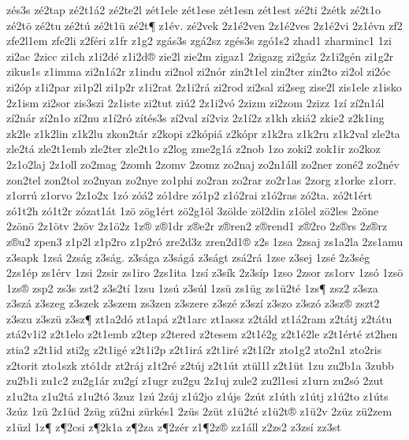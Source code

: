 {z^^e9s3s
z^^e92tap
z^^e92t1^^e12
z^^e92te2l
z^^e9t1ele
z^^e9t1ese
z^^e9t1esn
z^^e9t1est
z^^e92ti
2z^^e9tk
z^^e92t1o
z^^e92t^^f6
z^^e92tu
z^^e92t^^fa
z^^e92t1^^fc
z^^e92t^^b6
z1^^e9v.
z^^e92vek
2z1^^e92ven
2z1^^e92ves
2z1^^e92vi
2z1^^e9vn
zf2
zfe2l1em
zfe2li
z2f^^e9ri
z1fr
z1g2
zg^^e1s3s
zg^^e12sz
zg^^e9s3s
zg^^f31s2
zhad1
zharminc1
1zi
zi2ac
2zicc
zi1ch
z1i2d^^e9
z1i2d^^ae
zie2l
zie2m
zigaz1
2zigazg
zi2g^^e1z
2z1i2g^^e9n
zi1g2r
zikus1s
z1imma
zi2n1^^e12r
z1indu
zi2nol
zi2n^^f3r
zin2t1el
zin2ter
zin2to
zi2ol
zi2^^f3c
zi2^^f3p
z1i2par
zi1p2l
zi1p2r
z1i2rat
2z1i2r^^e1
zi2rod
zi2sal
zi2seg
zise2l
zis1ele
z1isko
2z1ism
zi2sor
zis3szi
2z1iste
zi2tut
zi^^fa2
2z1i2v^^f3
2zizm
zi2zom
2zizz
1z^^ed
z^^ed2n1^^e1l
z^^ed2n^^e1r
z^^ed2n1o
z^^ed2nu
z1^^ed2r^^f3
z^^edt^^e9s3s
z^^ed2val
z^^ed2viz
2z1^^ed2z
z1kh
zki^^e12
zkie2
z2k1ing
zk2le
z1k2lin
z1k2lu
zkon2t^^e1r
z2kopi
z2k^^f3pi^^e1
z2k^^f3pr
z1k2ra
z1k2ru
z1k2val
zle2ta
zle2t^^e1
zle2t1emb
zle2ter
zle2t1o
z2log
zme2g1^^e1
z2nob
1zo
zoki2
zok1ir
zo2koz
2z1o2laj
2z1oll
zo2mag
2zomh
2zomv
2zomz
zo2naj
zo2n1^^e1ll
zo2ner
zon^^e92
zo2n^^e9v
zon2tel
zon2tol
zo2nyan
zo2nye
zo1phi
zo2ran
zo2rar
zo2r1as
2zorg
z1orke
z1orr.
z1orr^^fa
z1orvo
2z1o2x
1z^^f3
z^^f3^^e12
z^^f31dre
z^^f31p2
z1^^f32rai
z1^^f32ras
z^^f32ta.
z^^f32t1^^e9rt
z^^f31t2h
z^^f31t2r
z^^f3zat1^^e1t
1z^^f6
z^^f6g1^^e9rt
z^^f62g1^^f6l
3z^^f6lde
z^^f6l2din
z1^^f6lel
z^^f62les
2z^^f6ne
2z^^f6n^^f6
2z1^^f6tv
2z^^f6v
2z1^^f62z
1z^^ae
z^^ae1dr
z^^aee2r
z^^aeren2
z^^aerend1
z^^ae2ro
2z^^aers
2z^^aerz
z^^aeu2
zpen3
z1p2l
z1p2ro
z1p2r^^f3
zre2d3z
zren2d1^^ae
z2s
1zsa
2zsaj
zs1a2la
2zs1amu
z3sapk
1zs^^e1
2zs^^e1g
z3s^^e1g.
z3s^^e1ga
z3s^^e1g^^e1
z3s^^e1gt
zs^^e12r^^e1
1zse
z3sej
1zs^^e9
2z3s^^e9g
2zs1^^e9p
zs1^^e9rv
1zsi
2zsir
zs1iro
2zs1ita
1zs^^ed
z3s^^edk
2z3s^^edp
1zso
2zsor
zs1orv
1zs^^f3
1zs^^f6
1zs^^ae
zsp2
zs3s
zst2
z3s2t^^ed
1zsu
1zs^^fa
z3s^^fal
1zs^^fc
zs1^^fcg
zs1^^fc2t^^e9
1zs^^b6
zsz2
z3sza
z3sz^^e1
z3szeg
z3szek
z3szem
zs3zen
z3szere
z3sz^^e9
z3sz^^ed
z3szo
z3sz^^f3
z3sz^^ae
zszt2
z3szu
z3sz^^fc
z3sz^^b6
zt1a2d^^f3
zt1ap^^e1
z2t1arc
zt1assz
z2t^^e1ld
zt1^^e12ram
z2t^^e1tj
z2t^^e1tu
zt^^e12v1i2
z2t1elo
z2t1emb
z2tep
z2tered
z2tesem
z2t1^^e92g
z2t1^^e92le
z2t1^^e9rt^^e9
zt2hen
ztia2
z2t1id
zti2g
z2t1ig^^e9
z2t1i2p
z2t1ir^^e1
z2t1ir^^e9
z2t1^^ed2r
zto1g2
zto2n1
zto2ris
z2torit
zto1szk
zt^^f31dr
zt2r^^e1j
z1t2r^^e9
z2t^^faj
z2t1^^fat
zt^^fcl1l
z2t1^^fct
1zu
zu2b1a
3zubb
zu2b1i
zu1c2
zu2g1^^e1r
zu2g^^ed
z1ugr
zu2gu
2z1uj
zule2
zu2l1esi
z1urn
zu2s^^f3
2zut
z1u2ta
z1u2t^^e1
z1u2t^^f3
3zuz
1z^^fa
2z^^faj
z1^^fa2jo
z1^^fajs
2z^^fat
z1^^fath
z1^^fatj
z1^^fa2to
z1^^fats
3z^^faz
1z^^fc
2z1^^fcd
2z^^fcg
z^^fc2ni
z^^fcrk^^e9s1
2z^^fcs
2z^^fct
z1^^fc2t^^e9
z1^^fc2t^^ae
z1^^fc2v
2z^^fcz
z^^fc2zem
z1^^fczl
1z^^b6
z^^b62csi
z^^b62k1a
z^^b62za
z^^b62z^^e9r
z1^^b62z^^ae
zz1^^e1ll
z2zs2
z3zs^^ed
zz3st
}
\endgroup

